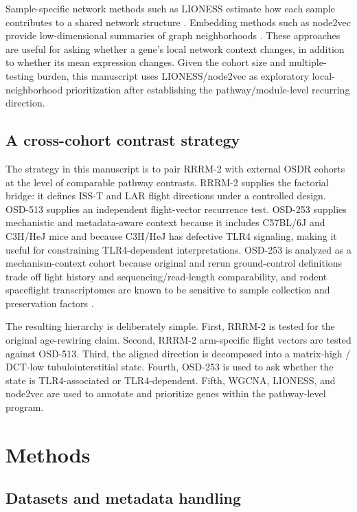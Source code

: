 \documentclass[11pt]{article}
\begin{document}
Sample-specific network methods such as LIONESS estimate how each sample contributes to a shared network structure \citep{kuijjer2019estimating}. Embedding methods such as node2vec provide low-dimensional summaries of graph neighborhoods \citep{grover2016node2vec}. These approaches are useful for asking whether a gene's local network context changes, in addition to whether its mean expression changes. Given the cohort size and multiple-testing burden, this manuscript uses LIONESS/node2vec as exploratory local-neighborhood prioritization after establishing the pathway/module-level recurring direction.

\subsection{A cross-cohort contrast strategy}

The strategy in this manuscript is to pair RRRM-2 with external OSDR cohorts at the level of comparable pathway contrasts. RRRM-2 supplies the factorial bridge: it defines ISS-T and LAR flight directions under a controlled design. OSD-513 supplies an independent flight-vector recurrence test. OSD-253 supplies mechanistic and metadata-aware context because it includes C57BL/6J and C3H/HeJ mice and because C3H/HeJ has defective TLR4 signaling, making it useful for constraining TLR4-dependent interpretations. OSD-253 is analyzed as a mechanism-context cohort because original and rerun ground-control definitions trade off light history and sequencing/read-length comparability, and rodent spaceflight transcriptomes are known to be sensitive to sample collection and preservation factors \citep{galazka2020rnaseq,preserve2016}.

The resulting hierarchy is deliberately simple. First, RRRM-2 is tested for the original age-rewiring claim. Second, RRRM-2 arm-specific flight vectors are tested against OSD-513. Third, the aligned direction is decomposed into a matrix-high / DCT-low tubulointerstitial state. Fourth, OSD-253 is used to ask whether the state is TLR4-associated or TLR4-dependent. Fifth, WGCNA, LIONESS, and node2vec are used to annotate and prioritize genes within the pathway-level program.

\section{Methods}

\subsection{Datasets and metadata handling}
\end{document}

